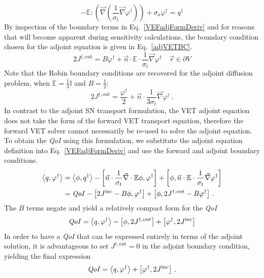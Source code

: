\documentclass[12pt]{report}
\newcommand{\vr}{\vec{r}}
\newcommand{\bra}{\left\langle}
\newcommand{\ket}{\right\rangle}
\newcommand{\sbra}{\left[}
\newcommand{\sket}{\right]}
\renewcommand{\div}{\vec{\nabla} \cdot}
\newcommand{\grad}{\vec{\nabla}}
\newcommand{\vefadj}{\varphi^\dag}
\newcommand{\bound}{\partial V}
\newcommand{\vn}{\vec{n}}
\newcommand{\Edd}{\mathbb{E}}
\newcommand{\sigt}{\sigma_t}
\newcommand{\siga}{\sigma_a}
\newcommand{\scalSource}{q}
\newcommand{\scalResp}{q^\dag}
\newcommand{\qoi}{{\it QoI}\xspace}
\begin{document}
\begin{equation}
\label{adjForm}
- \Edd : \left( \grad \left( \frac{1}{\sigt}\grad \vefadj \right) \right) + \siga \vefadj = \scalResp
\end{equation}
By inspection of the boundary terms in Eq.~\eqref{VEFadjFormDeriv} and for reasons that will become apparent during sensitivity calculations, the boundary condition chosen for the adjoint equation is given in Eq.~\eqref{adjVETBC}.
\begin{equation}
\label{adjVETBC}
2J^{\dag,\text{out}} = B \vefadj+ \vn \cdot
\Edd \cdot \frac{1}{\sigma_{t} } \vec{\nabla} \vefadj    \quad \vr \in \bound
\end{equation}
Note that the Robin boundary conditions are recovered for the adjoint diffusion problem, when $\Edd = \tfrac{1}{3} \mathbb{I}$ and $B=\tfrac{1}{2}$:
\[
2 J^{\dag,\text{out}} = \frac{\vefadj}{2} +\vn \cdot \frac{1}{3\sigt} \grad \vefadj \,.
\]
In contrast to the adjoint SN transport formulation, the VET adjoint equation does not take the form of the  
forward VET transport equation, therefore the forward VET solver 
cannot necessarily be re-used to solve the adjoint equation. 
To obtain the \qoi using this formulation, we substitute the adjoint equation definition 
into Eq.~\eqref{VEFadjFormDeriv} and use the forward and adjoint boundary conditions.
\begin{equation}
\label{VETQoIAdjUnpDeriv}
\begin{split}
 \bra \scalSource , \vefadj \ket 
&=   \bra \phi, \scalResp \ket - \sbra \vn \cdot \frac{1}{\sigt}\div \Edd \phi, \vefadj \sket + \sbra \phi, \vn \cdot \Edd \cdot \frac{1}{\sigt} \grad \vefadj \sket \\
&=   \qoi - \sbra 2J^{\text{inc}} - B \phi, \vefadj \sket + \sbra \phi, 2J^{\dag,\text{out}} - B \vefadj \sket \,.
\end{split}
\end{equation}
The $B$ terms negate and yield a relatively compact form for the \qoi
\begin{equation}
\label{VETQoIAdj}
\qoi=\bra \scalSource , \vefadj \ket 
- \sbra \phi, 2J^{\dag,\text{out}} \sket  + \sbra \varphi^\dag, 2J^{\text{inc}} \sket
\end{equation}
In order to have a \qoi that can be expressed entirely in terms of the adjoint solution, it is advantageous to 
set $J^{\dag,\text{out}}=0$ in the adjoint boundary condition, yielding the final expression
\begin{equation}
\qoi=\bra \scalSource , \vefadj \ket  + \sbra \vefadj, 2J^{\text{inc}} \sket \,.
\end{equation}
\end{document}
